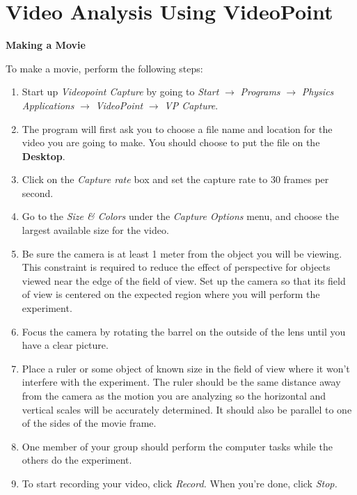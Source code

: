 
\section{Video Analysis Using VideoPoint}

\textbf{Making a Movie} 

To make a movie, perform the following steps:

\begin{enumerate}
\item Start up \textit{Videopoint Capture} by
going to \textit{Start} $\rightarrow$ \textit{Programs} $\rightarrow$
\textit{Physics Applications} $\rightarrow$ \textit{VideoPoint}
$\rightarrow$ \textit{VP Capture}.

\item The program will first ask you to choose a file name and location for 
the video you are going to make.  You should choose to put the file
on the \textbf{Desktop}.

\item Click on the \textit{Capture rate}
box and set the capture rate to 30 frames per second. 

\item Go to the \textit{Size \& Colors} under the \textit{Capture Options} 
menu, and choose the largest available size for the video.



\item Be sure the camera is at least 1 meter from the object
you will be viewing. This constraint is required to reduce the effect
of perspective for objects viewed near the edge of the field of view.
Set up the camera so that its field of view is centered on the expected
region where you will perform the experiment. 
\item Focus the camera by rotating the barrel on the outside
of the lens until you have a clear picture.
\item Place a ruler or some
object of known size in the field of view where it won't interfere
with the experiment. The ruler should be the same distance away from
the camera as the motion you are analyzing so the horizontal and vertical 
scales will be accurately determined. It should also be parallel to one of the
sides of the movie frame.
\item One member of your group should perform the computer tasks while the
others do the experiment. 
\item To start recording your video, click \textit{Record.}  When
you're done, click \textit{Stop.}


\end{enumerate}
